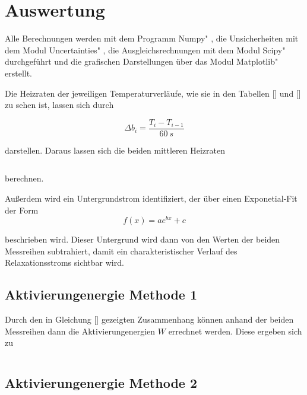 \section{Auswertung}
\label{sec:Auswertung}
Alle Berechnungen werden mit dem Programm \glqq Numpy" \cite{numpy}, die Unsicherheiten mit dem Modul \glqq Uncertainties" \cite{uncertainties}, die Ausgleichsrechnungen mit dem Modul \glqq Scipy" \cite{scipy} durchgeführt und die grafischen Darstellungen über das Modul \glqq Matplotlib" \cite{matplotlib} erstellt.

Die Heizraten der jeweiligen Temperaturverläufe, wie sie in den Tabellen [] und [] zu sehen ist, lassen sich durch 

\begin{equation}
    \Delta b_i = \frac{T_i - T_{i-1}}{\SI{60}{s} }
\end{equation}

darstellen. Daraus lassen sich die beiden mittleren Heizraten 

\begin{equation}
    
\end{equation}

berechnen. 

Außerdem wird ein Untergrundstrom identifiziert, der über einen Exponetial-Fit der Form 
\begin{equation}
    f(x) = a e^{bx} + c
\end{equation}

beschrieben wird. Dieser Untergrund wird dann von den Werten der beiden Messreihen subtrahiert, damit ein charakteristischer Verlauf des Relaxationsstroms sichtbar wird. 

\subsection{Aktivierungenergie Methode 1}

Durch den in Gleichung [] gezeigten Zusammenhang können anhand der beiden Messreihen dann die Aktivierungenergien $W$ errechnet werden. Diese ergeben sich zu 

\begin{equation}
    
\end{equation}


\subsection{Aktivierungenergie Methode 2}

